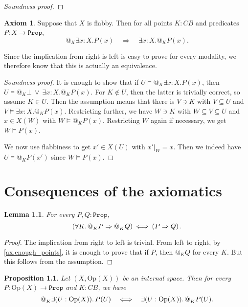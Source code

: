 \documentclass[11pt, oneside, article]{memoir}
\makeatletter
\newcommand{\tob}[1]{\todo[color=blue!40,inline]{\textbf{T:} #1}}
\theoremstyle{plain}
\newtheorem{proposition}[theorem]{Proposition}
\newtheorem{lemma}[theorem]{Lemma}
\theoremstyle{definition}
\newtheorem{axiom}{Axiom}
\theoremstyle{remark}
\newenvironment{soundproof}{\begin{proof}[Soundness proof]}{\end{proof}}
\newcommand{\const}[1]{\mathtt{#1}}
\newcommand{\Set}[1]{\mathrm{#1}}
\newcommand{\Prop}{\const{Prop}}
\newcommand{\Op}{\Set{Op}}
\newcommand{\BaseSpace}{B}
\newcommand{\CB}{C\BaseSpace}
\newcommand{\AtSymbol}{{@}}
\newcommand{\At}[2][]{\AtSymbol^{#1}_{#2}}
\newcommand{\imp}{\Rightarrow}
\makeatother
\begin{document}
\begin{soundproof}
	\tob{tbw}
\end{soundproof}

\begin{axiom}
	\label{ax:flabby_vs_at}
	Suppose that $X$ is flabby. Then for all points $K : \CB$ and predicates $P : X \to \Prop$,
	\[
		\At{K}\exists x:X. P(x) \quad \Longrightarrow \quad \exists x:X.\At{K}P(x).
	\]
\end{axiom}

Since the implication from right is left is easy to prove for every modality, we therefore know that this is actually an equivalence.

\begin{soundproof}
	It is enough to show that if $U \models \At{K} \exists x:X.P(x)$, then $U \models \At{K}\bot \:\lor\: \exists x:X.\At{K}P(x)$. For $K\not\in U$, then the latter is trivially correct, so assume $K \in U$. Then the assumption means that there is $V\ni K$ with $V\subseteq U$ and $V\models \exists x:X.\At{K} P(x)$. Restricting further, we have $W\ni K$ with $W\subseteq V\subseteq U$ and $x\in X(W)$ with $W \models \At{K} P(x)$. Restricting $W$ again if necessary, we get $W \models P(x)$.

	We now use flabbiness to get $x'\in X(U)$ with $x'|_W = x$. Then we indeed have $U\models \At{K} P(x')$ since $W\models P(x)$.
\end{soundproof}


\chapter{Consequences of the axiomatics}

\begin{lemma}
For every $P,Q : \Prop$,
\[
	\left(\forall K\ldotp \At{K} P \imp \At{K} Q\right) \: \Longleftrightarrow \: \left(P \imp Q\right).
\]
\end{lemma}

\begin{proof}
	The implication from right to left is trivial. From left to right, by \cref{ax.enough_points}, it is enough to prove that if $P$, then $\At{K} Q$ for every $K$. But this follows from the assumption.
\end{proof}

\begin{proposition}
	Let $(X,\Op(X))$ be an internal space. Then for every $P : \Op(X)\to \Prop$ and $K : \CB$, we have
	\[
		\At{K} \exists (U : \Op(X))\ldotp P(U) \quad \Longleftrightarrow \quad \exists (U : \Op(X))\ldotp \At{K} P(U).
	\]
\end{proposition}
\end{document}
